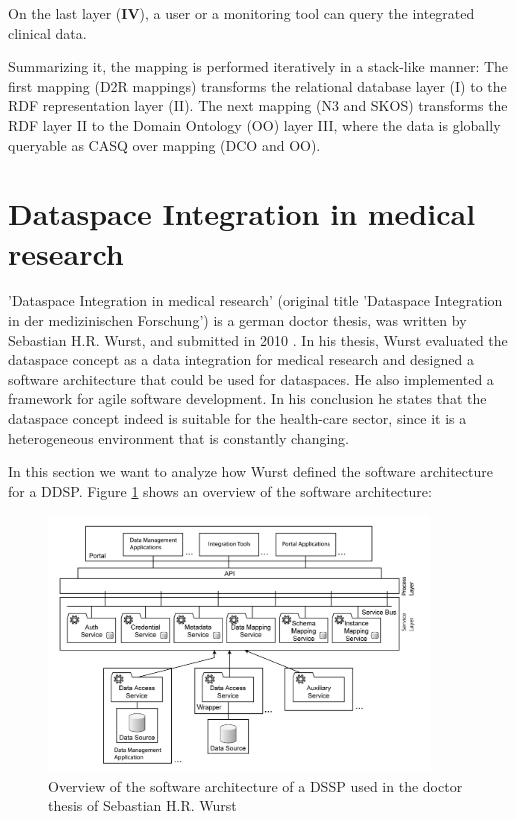 On the last layer (\textbf{IV}), a user or a monitoring tool can query the integrated clinical data.

Summarizing it, the mapping is performed iteratively in a stack-like manner:
The first mapping \textalpha (D2R mappings) transforms the relational database layer (I) to the RDF representation layer (II). The next mapping \textbeta (N3 and SKOS) transforms the RDF layer II to the Domain Ontology (OO) layer III, where the data is globally queryable as CASQ over mapping \textgamma (DCO and OO).  

\section{Dataspace Integration in medical research}

'Dataspace Integration in medical research' (original title 'Dataspace Integration in der medizinischen Forschung') is a german doctor thesis, was written by Sebastian H.R. Wurst, and submitted in 2010 \cite{WurstDiss}. In his thesis, Wurst evaluated the dataspace concept as a data integration for medical research and designed a software architecture that could be used for dataspaces. He also implemented a framework for agile software development. 
In his conclusion he states that the dataspace concept indeed is suitable for the health-care sector, since it is a heterogeneous environment that is constantly changing.

In this section we want to analyze how Wurst defined the software architecture for a DDSP. Figure \ref{SoftwareArchitectureDSSPWurst} shows an overview of the software architecture:

\begin{figure}[H]
	\begin{center}
		\includegraphics[width=0.9\textwidth]{figures/DataspaceIntegrationInDerMedForschungFigure31.PNG}
	\end{center}
	\caption{Overview of the software architecture of a DSSP used in the doctor thesis of Sebastian H.R. Wurst \cite[p. 117, Figure 31, english translation]{WurstDiss}}
	\label{SoftwareArchitectureDSSPWurst}
\end{figure}

